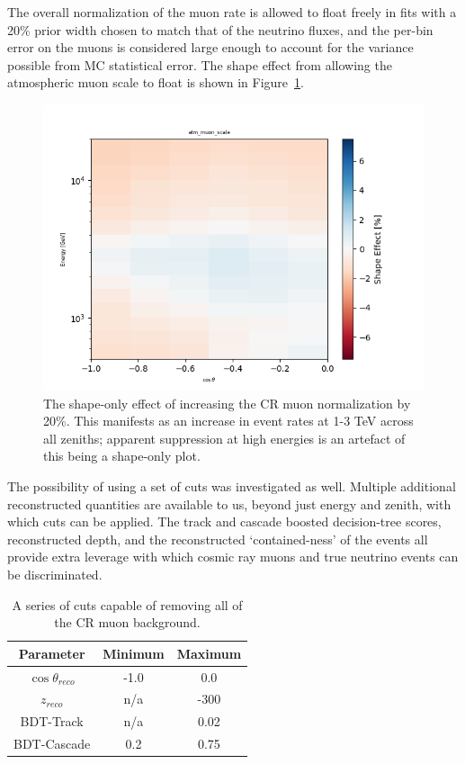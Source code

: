 \documentclass[main.tex]{subfiles}
\begin{document}
The overall normalization of the muon rate is allowed to float freely in fits with a 20\% prior width chosen to match that of the neutrino fluxes, and the per-bin error on the muons is considered large enough to account for the variance possible from MC statistical error.
The shape effect from allowing the atmospheric muon scale to float is shown in Figure~\ref{fig:muon_shape}.

\begin{figure}
    \centering
    \includegraphics[width=0.8\linewidth]{figures/atm_muon_scale.png}
    \caption{The shape-only effect of increasing the CR muon normalization by 20\%. This manifests as an increase in event rates at 1-3 TeV across all zeniths; apparent suppression at high energies is an artefact of this being a shape-only plot.}\label{fig:muon_shape}
\end{figure}

The possibility of using a set of cuts was investigated as well. 
Multiple additional reconstructed quantities are available to us, beyond just energy and zenith, with which cuts can be applied. 
The track and cascade boosted decision-tree scores, reconstructed depth, and the reconstructed `contained-ness' of the events all provide extra leverage with which cosmic ray muons and true neutrino events can be discriminated.

\begin{table}
    \centering
    \begin{tabular}{c|cc}\rowcolor{blue!25}
        Parameter & Minimum & Maximum \\\hline
        $\cos\theta_{reco}$ & -1.0 & 0.0 \\
        $z_{reco}$ & n/a & -300 \\
        BDT-Track & n/a & 0.02 \\
        BDT-Cascade & 0.2 & 0.75
    \end{tabular}
    \caption{A series of cuts capable of removing all of the CR muon background.}\label{tab:cut_table}
\end{table}
\end{document}

